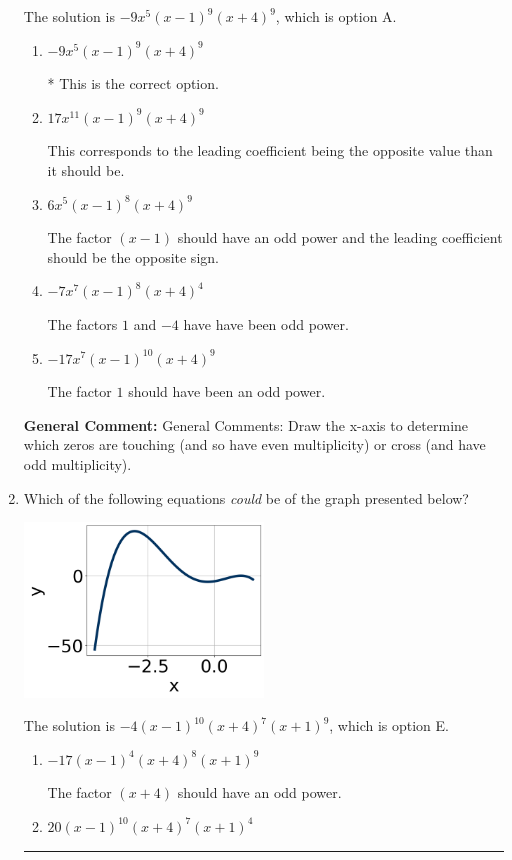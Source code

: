 \documentclass{extbook}[14pt]
\newcommand{\litem}[1]{\item #1

\rule{\textwidth}{0.4pt}}
\begin{document}
\begin{enumerate}
{The solution is \( -9x^{5} (x - 1)^{9} (x + 4)^{9} \), which is option A.\begin{enumerate}[label=\Alph*.]
\item \( -9x^{5} (x - 1)^{9} (x + 4)^{9} \)

* This is the correct option.
\item \( 17x^{11} (x - 1)^{9} (x + 4)^{9} \)

This corresponds to the leading coefficient being the opposite value than it should be.
\item \( 6x^{5} (x - 1)^{8} (x + 4)^{9} \)

The factor $(x - 1)$ should have an odd power and the leading coefficient should be the opposite sign.
\item \( -7x^{7} (x - 1)^{8} (x + 4)^{4} \)

The factors $1$ and $-4$ have have been odd power.
\item \( -17x^{7} (x - 1)^{10} (x + 4)^{9} \)

The factor $1$ should have been an odd power.
\end{enumerate}

\textbf{General Comment:} General Comments: Draw the x-axis to determine which zeros are touching (and so have even multiplicity) or cross (and have odd multiplicity).
}
\litem{
Which of the following equations \textit{could} be of the graph presented below?

\begin{center}
    \includegraphics[width=0.5\textwidth]{../Figures/polyGraphToFunctionCopyB.png}
\end{center}


The solution is \( -4(x - 1)^{10} (x + 4)^{7} (x + 1)^{9} \), which is option E.\begin{enumerate}[label=\Alph*.]
\item \( -17(x - 1)^{4} (x + 4)^{8} (x + 1)^{9} \)

The factor $(x + 4)$ should have an odd power.
\item \( 20(x - 1)^{10} (x + 4)^{7} (x + 1)^{4} \)


\end{enumerate}}
\end{enumerate}
\end{document}
